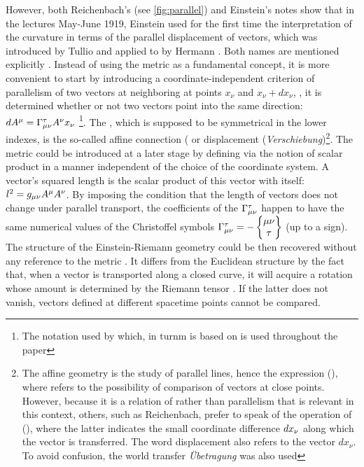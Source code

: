 \documentclass[draft]{article}
\newcommand{\xdx}{\ensuremath{x_\nu} and \ensuremath{x_\nu + dx_\nu}\xspace}
\begin{document}
However, both Reichenbach's (see \cref{fig:parallel}) and Einstein's notes show that in the lectures May-June 1919, Einstein used for the first time the interpretation of the curvature in terms of the parallel displacement of vectors, which was introduced by Tullio \citet{Levi-Civita1916} and applied to \rt by Hermann \citet{Weyl1918}. Both names are mentioned explicitly \citep[028-01-03, 33]{HR}. Instead of using the metric as a fundamental concept, it is more convenient to start by introducing a coordinate-independent criterion of parallelism of two vectors at neighboring at points \xdx, \ie, it is determined whether or not two vectors point into the same direction: $dA^\mu=\Gamma^\tau_{\mu\nu} A^\nu x_\nu$ \citep[028-01-03, 33]{HR}\footnote{The notation used by \citet{Reichenbach1928} which, in turnm is based on \citet{Eddington1923,Eddington1925} is used throughout the paper}. The \Gtmn, which is supposed to be symmetrical in the lower indexes, is the so-called affine connection ( or displacement (\textit{Verschiebung})\footnote{The affine geometry is the study of parallel lines, \citet{Weyl1918b} hence the expression  (), where  refers to the possibility of comparison of vectors at close points. However, because it is a relation of  rather than parallelism that is relevant in this context, others, such as Reichenbach, prefer to speak of the operation of  (), where the latter indicates the small coordinate difference $dx_{\nu}$ along which the vector is transferred. The word displacement also refers to the vector $dx_\nu$. To avoid confusion, the world transfer \textit{Übetragung} was also used}. The metric could be introduced at a later stage by defining via the notion of scalar product in a manner independent of the choice of the coordinate system. A vector's squared length is the scalar product of this vector with itself: $l^2=g_{\mu\nu} A^\mu A^\nu$. By imposing the condition that the length of vectors does not change under parallel transport, the coefficients of the $\Gamma^\tau_{\mu\nu}$ happen to have the same numerical values of the Christoffel symbols $\Gamma^\tau_{\mu\nu} = - \begin{Bmatrix} \mu \nu \\ \tau \end{Bmatrix}$ (up to a sign). The structure of the Einstein-Riemann geometry could be then recovered without any reference to the metric \gmn. It differs from the Euclidean structure by the fact that, when a vector is transported along a closed curve, it will acquire a rotation whose amount is determined by the Riemann tensor \riteg. If the latter does not vanish, vectors defined at different spacetime points cannot be compared.
\end{document}
